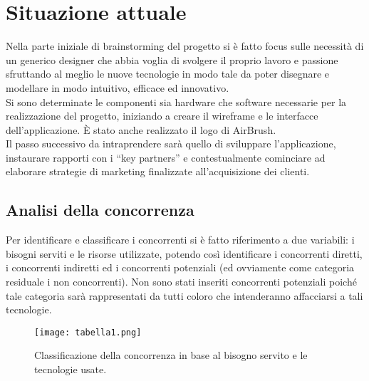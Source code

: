 \documentclass[11pt,fleqn]{book} %
\begin{document}
\section{Situazione attuale}
Nella parte iniziale di brainstorming del progetto si è fatto focus sulle necessità di un generico designer che abbia voglia di svolgere il proprio lavoro e passione sfruttando al meglio le nuove tecnologie in modo tale da poter disegnare e modellare in modo intuitivo, efficace ed innovativo.
\\Si sono determinate le componenti sia hardware che software necessarie per la realizzazione del progetto, iniziando a creare il wireframe e le interfacce dell'applicazione. È stato anche realizzato il logo di AirBrush.\\
Il passo successivo da intraprendere sarà quello di sviluppare l'applicazione, instaurare
rapporti con i “key partners” e contestualmente cominciare ad elaborare strategie di marketing finalizzate all'acquisizione dei clienti.
\\
\subsection{Analisi della concorrenza}
Per identificare e classificare i concorrenti si è fatto riferimento a due variabili: i
bisogni serviti e le risorse utilizzate, potendo così identificare i concorrenti diretti, i
concorrenti indiretti ed i concorrenti potenziali (ed ovviamente come categoria residuale
i non concorrenti). Non sono stati inseriti concorrenti potenziali poiché tale categoria sarà
rappresentati da tutti coloro che intenderanno affacciarsi a tali tecnologie.\\
\newpage

				
\begin{figure}[h]
   \centering
    \texttt{[image: tabella1.png]}
   \caption{Classificazione della concorrenza in base al bisogno servito e le tecnologie usate.}
    \label{fig:awesome_image}
\end{figure}

				
\end{document}
